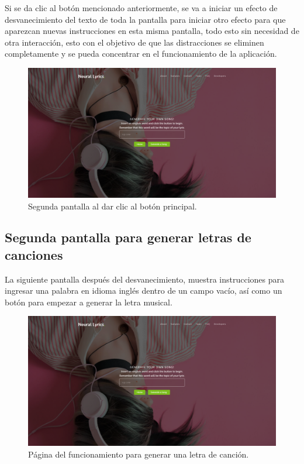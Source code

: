 \documentclass[12pt, a4paper, titlepage]{report}
\begin{document}
Si se da clic al botón mencionado anteriormente, se va a iniciar un efecto de desvanecimiento del texto de toda la pantalla para iniciar otro efecto para que aparezcan nuevas instrucciones en esta misma pantalla, todo esto sin necesidad de otra interacción, esto con el objetivo de que las distracciones se eliminen completamente y se pueda concentrar en el funcionamiento de la aplicación.
\begin{figure}[H] 
	\includegraphics[width=13.5cm]{./imagenes/Pruebas/pform.png}
	\centering \caption{Segunda pantalla al dar clic al botón principal.}
\end{figure}

\subsection{Segunda pantalla para generar letras de canciones}

La siguiente pantalla después del desvanecimiento, muestra instrucciones para ingresar una palabra en idioma inglés dentro de un campo vacío, así como un botón para empezar a generar la letra musical.
\begin{figure}[H] 
	\includegraphics[width=13.5cm]{./imagenes/Pruebas/pform.png}
	\centering \caption{Página del funcionamiento para generar una letra de canción.}
\end{figure}
\end{document}
